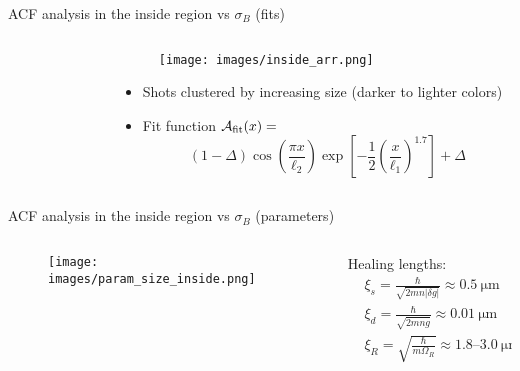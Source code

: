 \documentclass[aspectratio=169]{beamer}
\begin{document}
\begin{frame}{ACF analysis in the inside region vs $\sigma_B$ (fits)}
  \begin{columns}
    \begin{column}{0.50\textwidth}
      \begin{figure}
        \centering
      \end{figure}
    \end{column}
    \begin{column}{0.50\textwidth}
      \begin{figure}
        \centering
        \texttt{[image: images/inside\_arr.png]}
      \end{figure}
      \begin{itemize}
        \item Shots clustered by increasing size (darker to lighter colors)
        \item Fit function $\mathcal{A}_{\rm fit}(x) = $
        \begin{equation*}
          (1 - \Delta)\cos(\frac{\pi x}{\ell_2})\exp[-\frac{1}{2}\left(\frac{x}{\ell_1}\right)^{1.7}] + \Delta
        \end{equation*}
      \end{itemize}
    \end{column}
  \end{columns}
\end{frame}

\begin{frame}{ACF analysis in the inside region vs $\sigma_B$ (parameters)}
  \begin{columns}
    \begin{column}{0.7\textwidth}
      \begin{figure}
        \centering
        \texttt{[image: images/param\_size\_inside.png]}
      \end{figure}
    \end{column}
    \begin{column}{0.3\textwidth}
      Healing lengths:
      \begin{align*}
        &\xi_s = \frac{\hbar}{\sqrt{2mn|\delta g|}} \approx 0.5\ \unit{\micro\meter}\\
        &\xi_d = \frac{\hbar}{\sqrt{2mn\overline{g}}} \approx 0.01\ \unit{\micro\meter}\\
        &\xi_R = \sqrt{\frac{\hbar}{m\Omega_R}} \approx \numrange[range-phrase=-]{1.8}{3.0}\ \unit{\micro\meter}
      \end{align*}
    \end{column}
  \end{columns}
\end{frame}
\end{document}
